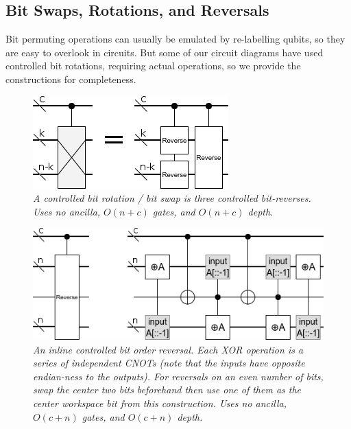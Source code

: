 \documentclass[twocolumn]{article}
\begin{document}
\subsection{Bit Swaps, Rotations, and Reversals}

Bit permuting operations can usually be emulated by re-labelling qubits, so they are easy to overlook in circuits.
But some of our circuit diagrams have used controlled bit rotations, requiring actual operations, so we provide the constructions for completeness.

\begin{figure}
  \centering
  \includegraphics[width=\linewidth]{assets/controlled-bit-rotate.png}
  \caption{\em
    A controlled bit rotation / bit swap is three controlled bit-reverses.
    Uses no ancilla, $O(n+c)$ gates, and $O(n+c)$ depth.
  }
  \label{fig:dependencies}
\end{figure}

\begin{figure}
  \centering
  \includegraphics[width=\linewidth]{assets/controlled-reverse.png}
  \caption{\em
    An inline controlled bit order reversal.
    Each XOR operation is a series of independent CNOTs (note that the inputs have opposite endian-ness to the outputs).
    For reversals on an even number of bits, swap the center two bits beforehand then use one of them as the center workspace bit from this construction.
    Uses no ancilla, $O(c + n)$ gates, and $O(c + n)$ depth.
  }
  \label{fig:dependencies}
\end{figure}
\end{document}
